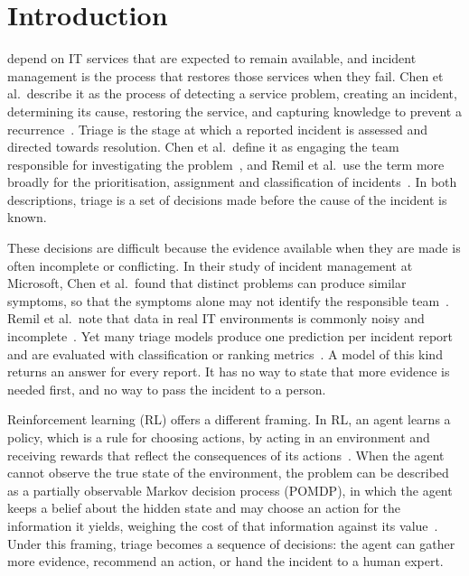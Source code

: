 \section{Introduction}

 depend on IT services that are expected to remain available, and incident management is the process that restores those services when they fail. Chen et al.\ describe it as the process of detecting a service problem, creating an incident, determining its cause, restoring the service, and capturing knowledge to prevent a recurrence~\cite{chen2020}. Triage is the stage at which a reported incident is assessed and directed towards resolution. Chen et al.\ define it as engaging the team responsible for investigating the problem~\cite{chen2020}, and Remil et al.\ use the term more broadly for the prioritisation, assignment and classification of incidents~\cite{remil2024}. In both descriptions, triage is a set of decisions made before the cause of the incident is known.

These decisions are difficult because the evidence available when they are made is often incomplete or conflicting. In their study of incident management at Microsoft, Chen et al.\ found that distinct problems can produce similar symptoms, so that the symptoms alone may not identify the responsible team~\cite{chen2020}. Remil et al.\ note that data in real IT environments is commonly noisy and incomplete~\cite{remil2024}. Yet many triage models produce one prediction per incident report and are evaluated with classification or ranking metrics~\cite{remil2024}. A model of this kind returns an answer for every report. It has no way to state that more evidence is needed first, and no way to pass the incident to a person.

Reinforcement learning (RL) offers a different framing. In RL, an agent learns a policy, which is a rule for choosing actions, by acting in an environment and receiving rewards that reflect the consequences of its actions~\cite{sutton2018}. When the agent cannot observe the true state of the environment, the problem can be described as a partially observable Markov decision process (POMDP), in which the agent keeps a belief about the hidden state and may choose an action for the information it yields, weighing the cost of that information against its value~\cite{kaelbling1998}. Under this framing, triage becomes a sequence of decisions: the agent can gather more evidence, recommend an action, or hand the incident to a human expert.

